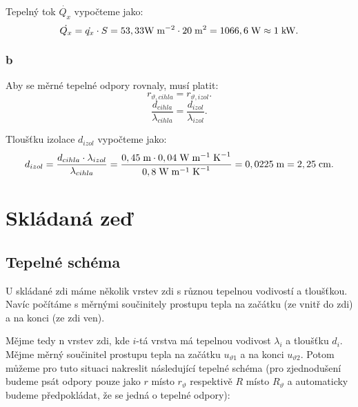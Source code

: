 \documentclass{article}
\begin{document}
Tepelný tok $\dot{Q_x}$ vypočteme jako:
$$
    \dot{Q_x} = \dot{q_x} \cdot S = 53,33 \textrm{W} \; \textrm{m}^{-2} \cdot 20 \; \textrm{m}^{\textrm{2}} = 1066,6 \; \textrm{W} \approx 1 \; \textrm{kW}.
$$

\subsubsection{b}
Aby se měrné tepelné odpory rovnaly, musí platit:
$$
    r_{\vartheta,cihla} = r_{\vartheta,izol}.
$$
$$
    \frac{d_{cihla}}{\lambda_{cihla}} = \frac{d_{izol}}{\lambda_{izol}}.
$$

Tloušťku izolace $d_{izol}$ vypočteme jako:
$$
    d_{izol} = \frac{d_{cihla} \cdot \lambda_{izol}}{\lambda_{cihla}} = \frac{0,45 \; \textrm{m} \cdot 0,04 \; \textrm{W} \; \textrm{m}^{-1} \; \textrm{K}^{-1}}{0,8 \; \textrm{W} \; \textrm{m}^{-1} \; \textrm{K}^{-1}} = 0,0225 \; \textrm{m} = 2,25 \; \textrm{cm}.
$$

\newpage



\section{ Skládaná zeď \spicy \spicy}


\subsection{Tepelné schéma}
U skládané zdi máme několik vrstev zdi s různou tepelnou vodivostí a tloušťkou. Navíc počítáme s měrnými součinitely prostupu tepla na začátku (ze vnitř do zdi) a na konci (ze zdi ven).

Mějme tedy n vrstev zdi, kde $i$-tá vrstva má tepelnou vodivost $\lambda_i$ a tloušťku $d_i$. Mějme měrný součinitel prostupu tepla na začátku $u_{\vartheta 1}$ a na konci $u_{\vartheta 2}$. Potom můžeme pro tuto situaci nakreslit následující tepelné schéma (pro zjednodušení budeme psát odpory pouze jako $r$ místo $r_{\vartheta}$ respektivě $R$ místo $R_{\vartheta}$ a automaticky budeme předpokládat, že se jedná o tepelné odpory):
\end{document}
